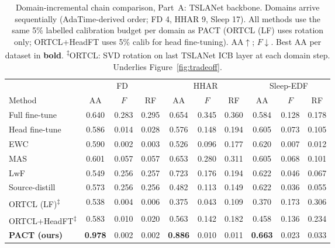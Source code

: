 \begin{table}[t]
\centering
\caption{Domain-incremental chain comparison, Part~A: TSLANet backbone.
Domains arrive sequentially (AdaTime-derived order; FD 4, HHAR 9, Sleep 17).
All methods use the same 5\% labelled calibration budget per domain as PACT
(ORTCL (LF) uses rotation only; ORTCL+HeadFT uses 5\% calib for head fine-tuning).
AA$\uparrow$; $F$$\downarrow$. Best AA per dataset in \textbf{bold}.
\textsuperscript{$\ddagger$}ORTCL: SVD rotation on last TSLANet ICB layer at each domain step.
Underlies Figure~\ref{fig:tradeoff}.}
\label{tab:chain-tslanet}
\small
\begin{tabular}{l ccc ccc ccc}
\toprule
& \multicolumn{3}{c}{FD} & \multicolumn{3}{c}{HHAR} & \multicolumn{3}{c}{Sleep-EDF}\\
\cmidrule(lr){2-4}\cmidrule(lr){5-7}\cmidrule(lr){8-10}
Method & AA & $F$ & RF & AA & $F$ & RF & AA & $F$ & RF\\
\midrule
Full fine-tune & 0.640 & 0.283 & 0.295 & 0.654 & 0.345 & 0.360 & 0.584 & 0.128 & 0.178\\
Head fine-tune & 0.586 & 0.014 & 0.028 & 0.576 & 0.148 & 0.194 & 0.605 & 0.073 & 0.105\\
EWC & 0.590 & 0.002 & 0.003 & 0.526 & 0.096 & 0.177 & 0.620 & 0.007 & 0.012\\
MAS & 0.601 & 0.057 & 0.057 & 0.653 & 0.280 & 0.311 & 0.605 & 0.068 & 0.101\\
LwF & 0.549 & 0.256 & 0.257 & 0.723 & 0.176 & 0.194 & 0.622 & 0.046 & 0.067\\
Source-distill & 0.573 & 0.256 & 0.256 & 0.482 & 0.113 & 0.149 & 0.622 & 0.036 & 0.055\\
ORTCL (LF)\textsuperscript{$\ddagger$} & 0.538 & 0.004 & 0.006 & 0.375 & 0.043 & 0.109 & 0.370 & 0.173 & 0.306\\
ORTCL+HeadFT\textsuperscript{$\ddagger$} & 0.583 & 0.010 & 0.020 & 0.563 & 0.142 & 0.182 & 0.458 & 0.136 & 0.234\\
\textbf{PACT (ours)} & \textbf{0.978} & 0.002 & 0.002 & \textbf{0.886} & 0.010 & 0.011 & \textbf{0.663} & 0.023 & 0.033\\
\bottomrule
\end{tabular}
\end{table}

